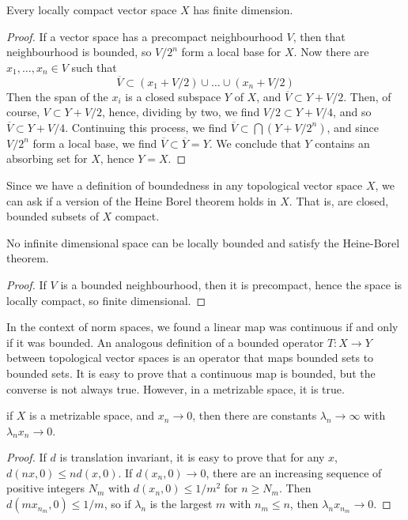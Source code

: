 \begin{theorem}
    Every locally compact vector space $X$ has finite dimension.
\end{theorem}
\begin{proof}
    If a vector space has a precompact neighbourhood $V$, then that neighbourhood is bounded, so $V/2^n$ form a local base for $X$. Now there are $x_1, \dots, x_n \in V$ such that
    \[ \overline{V} \subset (x_1 + V/2) \cup \dots \cup (x_n + V/2) \]
    Then the span of the $x_i$ is a closed subspace $Y$ of $X$, and $\overline{V} \subset Y + V/2$. Then, of course, $V \subset Y + V/2$, hence, dividing by two, we find $V/2 \subset Y + V/4$, and so $\overline{V} \subset Y + V/4$. Continuing this process, we find $\overline{V} \subset \bigcap (Y + V/2^n)$, and since $V/2^n$ form a local base, we find $\overline{V} \subset \overline{Y} = Y$. We conclude that $Y$ contains an absorbing set for $X$, hence $Y = X$.
\end{proof}

Since we have a definition of boundedness in any topological vector space $X$, we can ask if a version of the Heine Borel theorem holds in $X$. That is, are closed, bounded subsets of $X$ compact.

\begin{corollary}
    No infinite dimensional space can be locally bounded and satisfy the Heine-Borel theorem.
\end{corollary}
\begin{proof}
    If $V$ is a bounded neighbourhood, then it is precompact, hence the space is locally compact, so finite dimensional.
\end{proof}

In the context of norm spaces, we found a linear map was continuous if and only if it was bounded. An analogous definition of a bounded operator $T: X \to Y$ between topological vector spaces is an operator that maps bounded sets to bounded sets. It is easy to prove that a continuous map is bounded, but the converse is not always true. However, in a metrizable space, it is true.

\begin{lemma}
    if $X$ is a metrizable space, and $x_n \to 0$, then there are constants $\lambda_n \to \infty$ with $\lambda_n x_n \to 0$.
\end{lemma}
\begin{proof}
    If $d$ is translation invariant, it is easy to prove that for any $x$, $d(nx,0) \leq n d(x,0)$. If $d(x_n,0) \to 0$, there are an increasing sequence of positive integers $N_m$ with $d(x_n,0) \leq 1/m^2$ for $n \geq N_m$. Then $d(mx_{n_m},0) \leq 1/m$, so if $\lambda_n$ is the largest $m$ with $n_m \leq n$, then $\lambda_n x_{n_m} \to 0$.
\end{proof}

